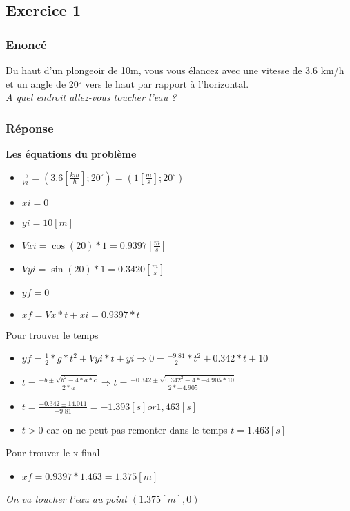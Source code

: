 \subsection{Exercice 1}
\subsubsection{Enoncé}
Du haut d'un plongeoir de 10m, vous vous élancez avec une vitesse de 3.6 km/h et un angle de 20$^{\circ}$ vers le haut par rapport à l'horizontal.
\\
\textit{A quel endroit allez-vous toucher l'eau ?}

\subsubsection{Réponse}
\textbf{Les équations du problème}
\begin{itemize}
    \item $_{Vi}^\rightarrow = (3.6[\frac{km}{h}];20^\circ) = (1[\frac{m}{s}];20^\circ)$
    \item $xi = 0$
    \item $yi = 10[m]$
    \item $Vxi = \cos(20) * 1 = 0.9397[\frac{m}{s}]$
    \item $Vyi = \sin(20) * 1 = 0.3420[\frac{m}{s}]$
    \item $yf = 0$
    \item $xf = Vx * t + xi = 0.9397 * t$
\end{itemize}
Pour trouver le temps
\begin{itemize}
    \item $yf = \frac{1}{2}*g*t^2+Vyi*t+yi \Rightarrow 0 = \frac{-9.81}{2}*t^2+0.342*t+10$
    \item $t = \frac{-b \pm \sqrt{b^2-4*a*c}}{2*a} \Rightarrow t = \frac{-0.342 \pm \sqrt{0.342^2-4*-4.905*10}}{2*-4.905}$
    \item $t = \frac{-0.342 \pm 14.011}{-9.81} = -1.393[s] or 1,463[s]$
    \item $t > 0$ car on ne peut pas remonter dans le temps $t = 1.463[s]$
\end{itemize}
Pour trouver le x final
\begin{itemize}
    \item $xf = 0.9397 * 1.463 = 1.375[m]$
\end{itemize}
\textit{On va toucher l'eau au point $(1.375[m],0)$}
